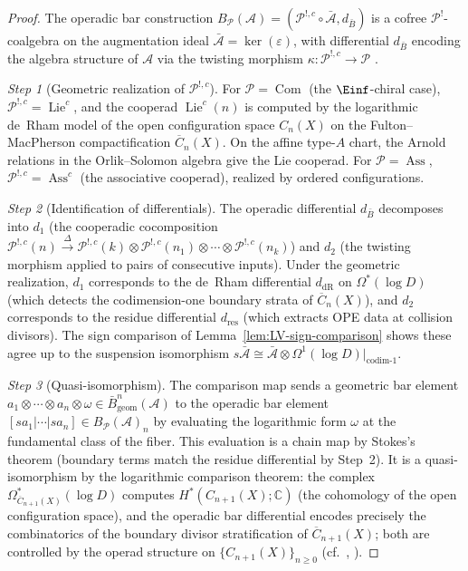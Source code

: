 \begin{proof}
The operadic bar construction
$B_{\mathcal{P}}(\mathcal{A}) =
(\mathcal{P}^{!,c} \circ \bar{\mathcal{A}}, d_{\bar{B}})$
is a cofree $\mathcal{P}^!$-coalgebra on the augmentation ideal
$\bar{\mathcal{A}} = \ker(\varepsilon)$, with differential $d_{\bar{B}}$
encoding the algebra structure of $\mathcal{A}$ via the twisting
morphism $\kappa: \mathcal{P}^{!,c} \to \mathcal{P}$
\cite[Theorem~6.5.7]{LV12}.

\emph{Step 1} (Geometric realization of $\mathcal{P}^{!,c}$).
For $\mathcal{P} = \operatorname{Com}$ (the $\Einf$-chiral case),
$\mathcal{P}^{!,c} = \operatorname{Lie}^c$, and the cooperad
$\operatorname{Lie}^c(n)$ is computed by the logarithmic de~Rham
model of the open configuration space $C_n(X)$ on the
Fulton--MacPherson compactification
$\overline{C}_n(X)$. On the affine type-$A$ chart, the Arnold
relations in the Orlik--Solomon algebra give the Lie cooperad.
For $\mathcal{P} = \operatorname{Ass}$,
$\mathcal{P}^{!,c} = \operatorname{Ass}^c$ (the associative
cooperad), realized by ordered configurations.

\emph{Step 2} (Identification of differentials).
The operadic differential $d_{\bar{B}}$ decomposes into $d_1$ (the cooperadic cocomposition $\mathcal{P}^{!,c}(n)
\xrightarrow{\Delta} \mathcal{P}^{!,c}(k)
\otimes \mathcal{P}^{!,c}(n_1) \otimes \cdots
\otimes \mathcal{P}^{!,c}(n_k)$) and $d_2$ (the twisting morphism applied to pairs of consecutive inputs).
Under the geometric realization, $d_1$ corresponds to the de~Rham
differential $d_{\mathrm{dR}}$ on $\Omega^*(\log D)$ (which detects
the codimension-one boundary strata of $\overline{C}_n(X)$), and
$d_2$ corresponds to the residue differential $d_{\mathrm{res}}$
(which extracts OPE data at collision divisors). The sign
  comparison of Lemma~\ref{lem:LV-sign-comparison} shows these agree up to
the suspension isomorphism
$s\bar{\mathcal{A}} \cong \bar{\mathcal{A}} \otimes
\Omega^1(\log D)|_{\text{codim-1}}$.

\emph{Step 3} (Quasi-isomorphism).
The comparison map sends a geometric bar element
$a_1 \otimes \cdots \otimes a_n \otimes \omega
\in \bar{B}_{\mathrm{geom}}^n(\mathcal{A})$
to the operadic bar element
$[sa_1 | \cdots | sa_n] \in B_{\mathcal{P}}(\mathcal{A})_n$
by evaluating the logarithmic form $\omega$ at the fundamental class
of the fiber. This evaluation is a chain map by Stokes's theorem
(boundary terms match the residue differential by Step~2).
It is a quasi-isomorphism by the logarithmic comparison theorem:
the complex $\Omega^*_{\overline{C}_{n+1}(X)}(\log D)$ computes
$H^*(C_{n+1}(X); \mathbb{C})$ (the cohomology of the open configuration
space), and the operadic bar differential encodes precisely the
combinatorics of the boundary divisor stratification of
$\overline{C}_{n+1}(X)$; both are controlled by the operad structure
on $\{C_{n+1}(X)\}_{n \geq 0}$
(cf.\ \cite[Theorem~3.7.4]{BD04}, \cite[Theorem~5.1]{Get95}).
\end{proof}


